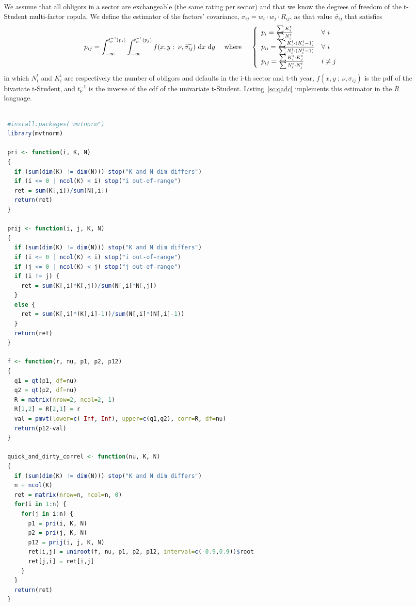 \documentclass[11pt,fleqn]{book} %
\begin{document}
\begin{definition}
	We assume that all obligors in a sector are exchangeable (the same rating 
	per sector) and that we know the degrees of freedom of the t-Student 
	multi-factor copula. We define the estimator of the factors' covariance, 
	$\sigma_{ij} = w_i \cdot w_j \cdot R_{ij}$, as that value 
	$\widetilde{\sigma_{ij}}$ that satisfies
	\begin{displaymath}
		p_{ij} = \displaystyle \int_{-\infty}^{t_{\nu}^{-1}(p_i)} \int_{-\infty}^{t_{\nu}^{-1}(p_j)} 
		f(x,y\ ;\ \nu, \widetilde{\sigma_{ij}}) \mathop{\,\mathrm{{}d}}\mathopen{} x \mathop{\,\mathrm{{}d}}\mathopen{} y
		\quad \text{ where } \quad
		\left\{
			\begin{array}{ll}
				p_i = \frac{\sum K_i^t}{\sum N_i^t} & \forall\ i \\
				p_{ii} = \frac{\sum K_i^t \cdot (K_i^t-1)}{\sum N_i^t \cdot (N_i^t-1)} & \forall\ i \\
				p_{ij} = \frac{\sum K_i^t \cdot K_j^t}{\sum N_i^t \cdot N_j^t} & i \ne j \\
			\end{array}
		\right.
	\end{displaymath}
	in which $N_i^t$ and $K_i^t$ are respectively the number of obligors and 
	defaults in the i-th sector and t-th year, $f(x,y\ ;\ \nu,\sigma_{ij})$ 
	is the pdf of the bivariate t-Student, and $t_{\nu}^{-1}$ is the inverse 
	of the cdf of the univariate t-Student. Listing~\ref{sc:qadc} implements 
	this estimator in the $R$ language.
\end{definition}

\begin{lstlisting}[language=R, label=sc:qadc, caption=Quick-and-dirty correlation (R script)]

 #install.packages("mvtnorm")
 library(mvtnorm)

 pri <- function(i, K, N)
 {
   if (sum(dim(K) != dim(N))) stop("K and N dim differs")
   if (i <= 0 | ncol(K) < i) stop("i out-of-range")
   ret = sum(K[,i])/sum(N[,i])
   return(ret)
 }

 prij <- function(i, j, K, N)
 {
   if (sum(dim(K) != dim(N))) stop("K and N dim differs")
   if (i <= 0 | ncol(K) < i) stop("i out-of-range")
   if (j <= 0 | ncol(K) < j) stop("j out-of-range")
   if (i != j) {
     ret = sum(K[,i]*K[,j])/sum(N[,i]*N[,j])
   }
   else {
     ret = sum(K[,i]*(K[,i]-1))/sum(N[,i]*(N[,i]-1))
   }
   return(ret)
 }

 f <- function(r, nu, p1, p2, p12)
 {
   q1 = qt(p1, df=nu)
   q2 = qt(p2, df=nu)
   R = matrix(nrow=2, ncol=2, 1)
   R[1,2] = R[2,1] = r
   val = pmvt(lower=c(-Inf,-Inf), upper=c(q1,q2), corr=R, df=nu)
   return(p12-val)
 }

 quick_and_dirty_correl <- function(nu, K, N)
 {
   if (sum(dim(K) != dim(N))) stop("K and N dim differs")
   n = ncol(K)
   ret = matrix(nrow=n, ncol=n, 0)
   for(i in 1:n) {
     for(j in i:n) {
       p1 = pri(i, K, N)
       p2 = pri(j, K, N)
       p12 = prij(i, j, K, N)
       ret[i,j] = uniroot(f, nu, p1, p2, p12, interval=c(-0.9,0.9))$root
       ret[j,i] = ret[i,j]
     }
   }
   return(ret)
 }

\end{lstlisting}
\end{document}
